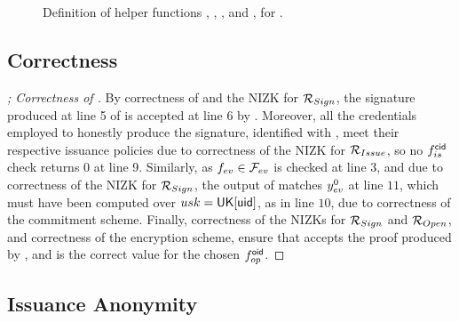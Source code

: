 \begin{figure}[ht!]
{\begin{minipage}[t]{\textwidth}
      
    \end{minipage}
  }
  \label{fig:helper-funcs}
  \caption{Definition of helper functions \ExtractIssue, \ExtractSign,
    \IdentifyCred, and \IdentifySig, for \CUASGen.}
\end{figure}

\subsection{Correctness}

\begin{proof}[; Correctness of \CUASGen]
  By correctness of \SBCM and the NIZK for $\mathcal{R}_{Sign}$, the signature
  produced at line 5 of \ExpCorrect is accepted at line 6 by \Verify.
  Moreover, all the credentials employed to honestly produce the signature,
  identified with \scid, meet their respective issuance policies due to
  correctness of the NIZK for $\mathcal{R}_{Issue}$, so no $f_{is}^\mathsf{cid}$ check
  returns $0$ at line 9. Similarly, as $f_{ev} \in \mathcal{F}_{ev}$ is checked at
  line 3, and due to correctness of the NIZK for $\mathcal{R}_{Sign}$, the
  output of \feval matches $y_{ev}^0$ at line $11$, which must have been
  computed over $usk=\mathsf{UK}[\mathsf{uid}]$, as in line $10$, due to correctness of the
  commitment scheme. Finally, correctness of the NIZKs for $\mathcal{R}_{Sign}$
  and $\mathcal{R}_{Open}$, and correctness of the encryption scheme, ensure that
  \Judge accepts the proof produced by \Open, and \yinsp is the correct value
  for the chosen $f_{op}^{\mathsf{oid}}$.
\end{proof}

\subsection{Issuance Anonymity}

